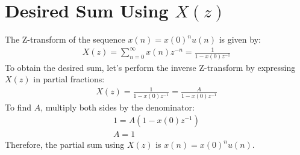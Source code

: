 \documentclass{article}
\begin{document}
\section*{Desired Sum Using $X(z)$}
The Z-transform of the sequence \( x(n) = x(0)^n u(n) \) is given by:
\begin{align}
X(z) = \sum_{n=0}^{\infty} x(n)z^{-n} = \frac{1}{1 - x(0)z^{-1}} 
\end{align}
To obtain the desired sum, let's perform the inverse Z-transform by expressing \( X(z) \) in partial fractions:
\begin{align}
X(z) = \frac{1}{1 - x(0)z^{-1}} = \frac{A}{1 - x(0)z^{-1}} 
\end{align}
To find \(A\), multiply both sides by the denominator:
\begin{align}
1 = A(1 - x(0)z^{-1}) \\
A=1
\end{align}
Therefore, the partial sum using \(X(z)\) is \(x(n) = x(0)^n u(n)\).
\end{document}
